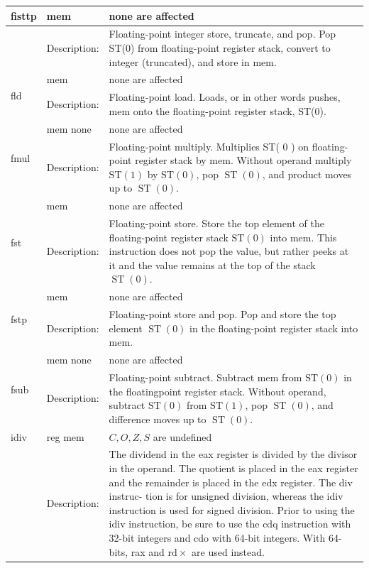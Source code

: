 \documentclass[10pt]{article}
\begin{document}
\begin{center}
\begin{tabular}{|l|l|l|}
\hline
\multirow[t]{2}{*}{fisttp} & mem & none are affected \\
\hline
 & Description: & Floating-point integer store, truncate, and pop. Pop ST(0) from floating-point register stack, convert to integer (truncated), and store in mem. \\
\hline
\multirow[t]{2}{*}{fld} & mem & none are affected \\
\hline
 & Description: & Floating-point load. Loads, or in other words pushes, mem onto the floating-point register stack, ST(0). \\
\hline
\multirow[t]{2}{*}{fmul} & mem none & none are affected \\
\hline
 & Description: & Floating-point multiply. Multiplies ST( 0 ) on floating-point register stack by mem. Without operand multiply $\mathrm{ST}(1)$ by $\mathrm{ST}(0)$, pop $\operatorname{ST}(0)$, and product moves up to $\operatorname{ST}(0)$. \\
\hline
\multirow[t]{2}{*}{fst} & mem & none are affected \\
\hline
 & Description: & Floating-point store. Store the top element of the floating-point register stack $\mathrm{ST}(0)$ into mem. This instruction does not pop the value, but rather peeks at it and the value remains at the top of the stack $\operatorname{ST}(0)$. \\
\hline
\multirow[t]{2}{*}{fstp} & mem & none are affected \\
\hline
 & Description: & Floating-point store and pop. Pop and store the top element $\operatorname{ST}(0)$ in the floating-point register stack into mem. \\
\hline
\multirow[t]{2}{*}{fsub} & mem none & none are affected \\
\hline
 & Description: & Floating-point subtract. Subtract mem from $\mathrm{ST}(0)$ in the floatingpoint register stack. Without operand, subtract $\mathrm{ST}(0)$ from $\mathrm{ST}(1)$, pop $\operatorname{ST}(0)$, and difference moves up to $\operatorname{ST}(0)$. \\
\hline
idiv & reg mem & $C, O, Z, S$ are undefined \\
\hline
 & Description: & The dividend in the eax register is divided by the divisor in the operand. The quotient is placed in the eax register and the remainder is placed in the edx register. The div instruc- tion is for unsigned division, whereas the idiv instruction is used for signed division. Prior to using the idiv instruction, be sure to use the cdq instruction with 32-bit integers and cdo with 64-bit integers. With 64-bits, rax and $\mathrm{rd} \times$ are used instead. \\
\hline
\end{tabular}
\end{center}
\end{document}
